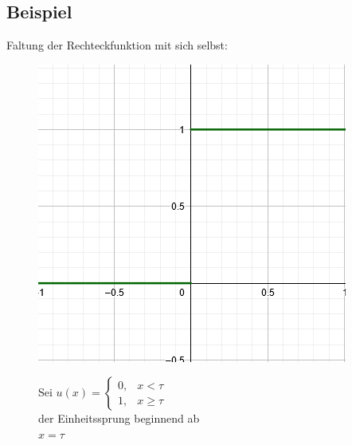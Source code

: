 \documentclass[12pt,a4paper]{article}
\newcommand{\nl}{\\[0.1cm]}
\begin{document}
\subsection{Beispiel}
Faltung der Rechteckfunktion mit sich selbst:\nl

\begin{minipage}{\linewidth}
\centering
\begin{minipage}{0.45\linewidth}
\begin{figure}[H]
\includegraphics[width=0.9\linewidth]{./resources/einheitssprung_funktion.png}
\end{figure}
\end{minipage}
\hspace{0.05\linewidth}
\begin{minipage}{0.45\linewidth}
\begin{figure}[H]
Sei $u(x) = \displaystyle \begin{cases} 0, & x<\tau \\ 1, & x\geq \tau \end{cases}$\\
der Einheitssprung beginnend ab\\ $x = \tau$
\end{figure}
\end{minipage}
\end{minipage}
\nl
\end{document}
